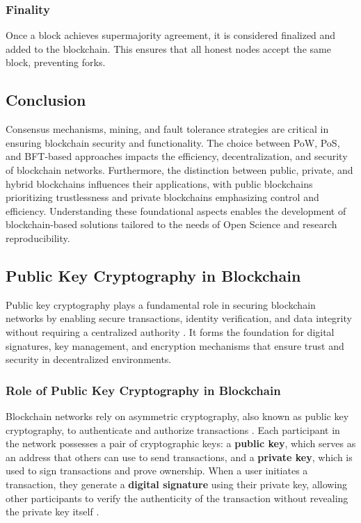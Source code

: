 \documentclass{article}
\begin{document}
\subsubsection{Finality}
Once a block achieves supermajority agreement, it is considered finalized and added to the blockchain. This ensures that all honest nodes accept the same block, preventing forks.


\subsection{Conclusion}
Consensus mechanisms, mining, and fault tolerance strategies are critical in ensuring blockchain security and functionality. The choice between PoW, PoS, and BFT-based approaches impacts the efficiency, decentralization, and security of blockchain networks. Furthermore, the distinction between public, private, and hybrid blockchains influences their applications, with public blockchains prioritizing trustlessness and private blockchains emphasizing control and efficiency. Understanding these foundational aspects enables the development of blockchain-based solutions tailored to the needs of Open Science and research reproducibility.


\subsection{Public Key Cryptography in Blockchain}

Public key cryptography plays a fundamental role in securing blockchain networks by enabling secure transactions, identity verification, and data integrity without requiring a centralized authority \cite{narayanan2016bitcoin}. It forms the foundation for digital signatures, key management, and encryption mechanisms that ensure trust and security in decentralized environments.

\subsubsection{Role of Public Key Cryptography in Blockchain}
Blockchain networks rely on asymmetric cryptography, also known as public key cryptography, to authenticate and authorize transactions \cite{rivest1978method}. Each participant in the network possesses a pair of cryptographic keys: a \textbf{public key}, which serves as an address that others can use to send transactions, and a \textbf{private key}, which is used to sign transactions and prove ownership. When a user initiates a transaction, they generate a \textbf{digital signature} using their private key, allowing other participants to verify the authenticity of the transaction without revealing the private key itself \cite{menezes1996handbook}.
\end{document}

